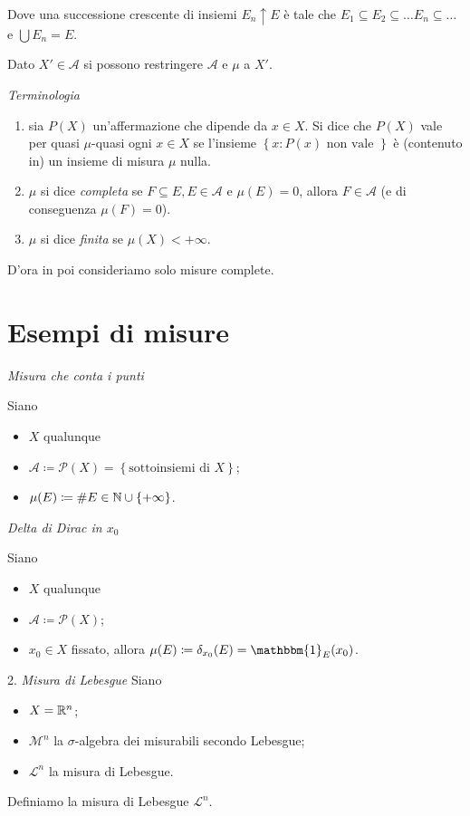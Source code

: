 \documentclass[a4paper, 11pt]{report}
\begin{document}
%
Dove una successione crescente di insiemi $E_n \uparrow E$ è tale che $E_1 \subseteq E_2 \subseteq \ldots E_n \subseteq \ldots $ e $\bigcup E_n = E$.
%
\begin{osservazione}
Dato $X' \in \mathcal{A}$ si possono restringere $\mathcal{A}$ e $\mu$ a $X'$.
\end{osservazione}
%
\textit{Terminologia}
\begin{enumerate}[label=(\arabic*)]
	\item sia $P(X)$ un'affermazione che dipende da $x \in X$. Si dice che $P(X)$ vale per quasi $\mu$-quasi ogni $x \in X$ se l'insieme $\left\{ x \colon P(x) \text{ non vale }  \right\}$ è (contenuto in) un insieme di misura $\mu$ nulla.
	\item $\mu$ si dice \textit{completa} se $F \subseteq E, E \in \mathcal{A}$ e $\mu(E) = 0$, allora $F \in \mathcal{A}$ (e di conseguenza $\mu(F) = 0$).
	\item $\mu$ si dice \textit{finita} se $\mu(X) < + \infty$.
\end{enumerate}
%
D'ora in poi consideriamo solo misure complete.
%
\section{Esempi di misure}
\textit{Misura che conta i punti}

Siano
\begin{itemize}
	\item $X$ qualunque
	\item $\mathcal{A} \coloneqq \mathcal{P}(X) = \left\{ \text{sottoinsiemi di } X \right\}$;
	\item $\mu(E) \coloneqq \# E \in \mathbb N \cup \left\{ +\infty \right\}$.
\end{itemize}
%
\textit{Delta di Dirac in $x_0$}

Siano
\begin{itemize}
	\item $X$ qualunque
	\item $\mathcal{A} \coloneqq \mathcal{P}(X)$;
	\item $x_0 \in X$ fissato, allora $\mu(E) \coloneqq \delta_{x_0}(E) = \mathbbm{1}_E (x_0)$.
\end{itemize}
%
2. \textit{Misura di Lebesgue}
Siano
\begin{itemize}
	\item $X = \mathbb R^n$;
	\item $\mathcal{M}^n$ la $\sigma$-algebra dei misurabili secondo Lebesgue;
	\item $\mathcal{L}^n$ la misura di Lebesgue.
\end{itemize}
%
Definiamo la misura di Lebesgue $\mathcal{L}^n$.
\end{document}
